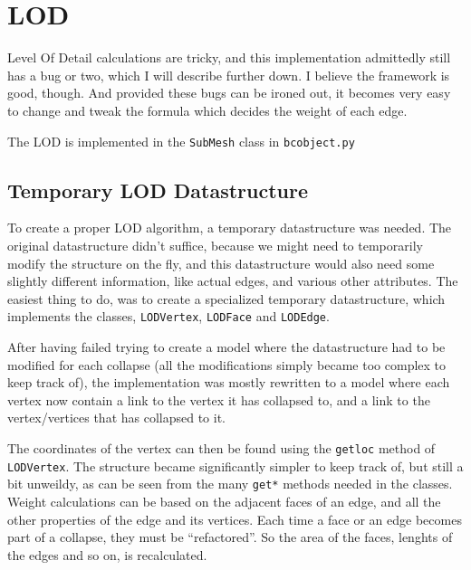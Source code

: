 \section*{LOD}
Level Of Detail calculations are tricky, and this implementation admittedly still has a bug or two, which I will describe further down. I believe the framework is good, though. And provided these bugs can be ironed out, it becomes very easy to change and tweak the formula which decides the weight of each edge.

The LOD is implemented in the \texttt{SubMesh} class in \texttt{bcobject.py}

\subsection*{Temporary LOD Datastructure}
To create a proper LOD algorithm, a temporary datastructure was needed. The original datastructure didn't suffice, because we might need to temporarily modify the structure on the fly, and this datastructure would also need some slightly different information, like actual edges, and various other attributes. The easiest thing to do, was to create a specialized temporary datastructure, which implements the classes, \texttt{LODVertex}, \texttt{LODFace} and \texttt{LODEdge}.

After having failed trying to create a model where the datastructure had to be modified for each collapse (all the modifications simply became too complex to keep track of), the implementation was mostly rewritten to a model where each vertex now contain a link to the vertex it has collapsed to, and a link to the vertex/vertices that has collapsed to it.

The coordinates of the vertex can then be found using the \texttt{getloc} method of \texttt{LODVertex}. The structure became significantly simpler to keep track of, but still a bit unweildy, as can be seen from the many \texttt{get*} methods needed in the classes. Weight calculations can be based on the adjacent faces of an edge, and all the other properties of the edge and its vertices. Each time a face or an edge becomes part of a collapse, they must be ``refactored''. So the area of the faces, lenghts of the edges and so on, is recalculated.


